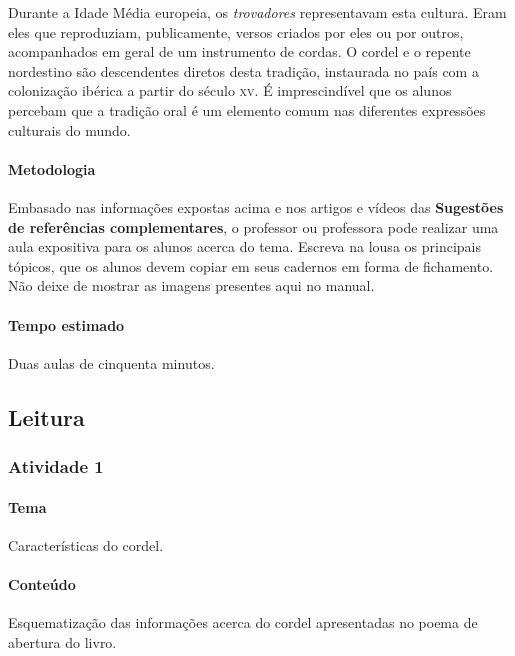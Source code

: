 \documentclass[11pt]{extarticle}
\begin{document}
Durante a Idade Média europeia, os \textit{trovadores} representavam esta cultura.
Eram eles que reproduziam, publicamente, versos criados por eles ou por outros, 
acompanhados em geral de um instrumento de cordas. O cordel e o repente nordestino
são descendentes diretos desta tradição, instaurada no país com a colonização ibérica
a partir do século \textsc{xv}. É imprescindível que os alunos 
percebam que a tradição oral é um elemento comum nas diferentes expressões
culturais do mundo.


\paragraph{Metodologia} Embasado nas informações expostas acima e nos
artigos e vídeos das \textbf{Sugestões de referências complementares},
o professor ou professora pode realizar uma aula expositiva para os
alunos acerca do tema. Escreva na lousa os principais tópicos,
que os alunos devem copiar em seus cadernos em forma de fichamento. 
Não deixe de mostrar as imagens presentes aqui no manual.


\paragraph{Tempo estimado} Duas aulas de cinquenta minutos.

\subsection{Leitura}

\subsubsection{Atividade 1} 

\paragraph{Tema} Características do cordel.

\paragraph{Conteúdo} Esquematização das informações acerca do cordel 
apresentadas no poema de abertura do livro. 
\end{document}
